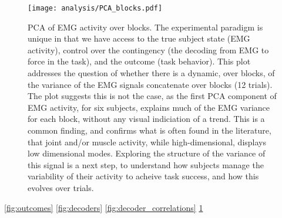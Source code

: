 \documentclass[../main.tex]{subfiles}
\begin{document}
\begin{figure}
\centering
\texttt{[image: analysis/PCA\_blocks.pdf]}
\caption{PCA of EMG activity over blocks. The experimental paradigm is
unique in that we have access to the true subject state (EMG activity),
control over the contingency (the decoding from EMG to force in the
task), and the outcome (task behavior). This plot addresses the question
of whether there is a dynamic, over blocks, of the variance of the EMG
signals concatenate over blocks (12 trials). The plot suggests this is
not the case, as the first PCA component of EMG activity, for six
subjects, explains much of the EMG variance for each block, without any
visual indiciation of a trend. This is a common finding, and confirms
what is often found in the literature, that joint and/or muscle
activity, while high-dimensional, displays low dimensional modes.
Exploring the structure of the variance of this signal is a next step,
to understand how subjects manage the variability of their activity to
acheive task success, and how this evolves over
trials.}\label{fig:behavior}
\end{figure}

\newpage

\cref{fig:outcomes}
\cref{fig:decoders}
\cref{fig:decoder_correlations}
\cref{fig:behavior}
\end{document}
